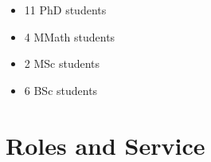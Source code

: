 \documentclass[10pt]{article}
\begin{document}
    
    
  
    
    
    
    
    
  
    
    
    
    
    
  

  
    
    
    
    
    
  
    
    
    
    
    
  

  
    
    
    
    
    
  
    
    
    
    
    
  

  
    
    
    
    
    
  
    
    
    
    
    
  

  
    
    
    
    
    
  
    
    
    
    
    
  


\begin{itemize}
\item 11 PhD students
\item 4 MMath students
\item 2 MSc students
\item 6 BSc students

\end{itemize}

\section{Roles and Service}
\end{document}
